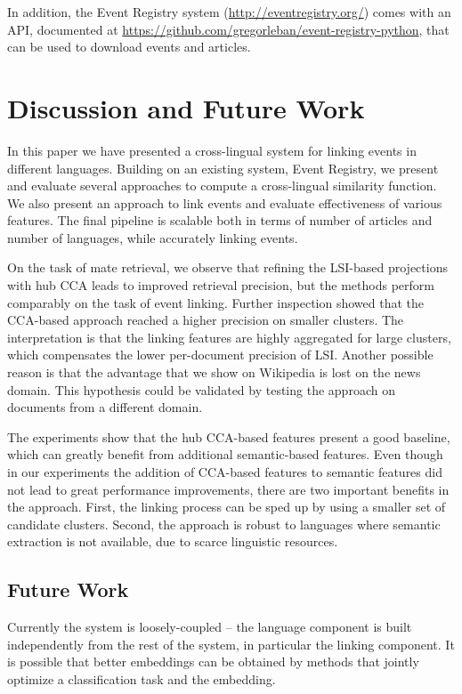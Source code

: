 \documentclass[twoside,11pt]{article}
\begin{document}
In addition, the Event Registry system (\url{http://eventregistry.org/}) comes with an API, documented at \url{https://github.com/gregorleban/event-registry-python}, that can be used to download events and articles.

\section{Discussion and Future Work}

In this paper we have presented a cross-lingual system for linking events in different languages. Building on an existing system, Event Registry, we present and evaluate several approaches to compute a  cross-lingual similarity function. We also present an approach to link events and evaluate effectiveness of various features.  The  final pipeline is scalable both in terms of number of articles and number of languages, while accurately linking events.

On the task of mate retrieval, we observe that refining the LSI-based projections with hub CCA leads to improved retrieval precision, but the methods perform comparably on the task of event linking. Further inspection showed that the CCA-based approach reached a higher precision on smaller clusters. The interpretation is that the linking features are highly aggregated for large clusters, which compensates the lower per-document precision of LSI. Another possible reason is that the advantage that we show on Wikipedia is lost on the news domain. This hypothesis could be validated by testing the approach on documents from a different domain.

The experiments show that the hub CCA-based features present a good baseline, which can greatly benefit from additional semantic-based features. Even though in our experiments the addition of CCA-based features to semantic features did not lead to great performance improvements, there are two important benefits in the approach. First, the linking process can be sped up by using a smaller set of candidate clusters. Second, the approach is robust to languages where semantic extraction is not available, due to scarce linguistic resources.

\subsection{Future Work}

Currently the system is loosely-coupled -- the language component is built independently from the rest of the system, in particular the linking component. It is possible that better embeddings can be obtained by methods that jointly optimize a classification task and the embedding.
		
\end{document}
